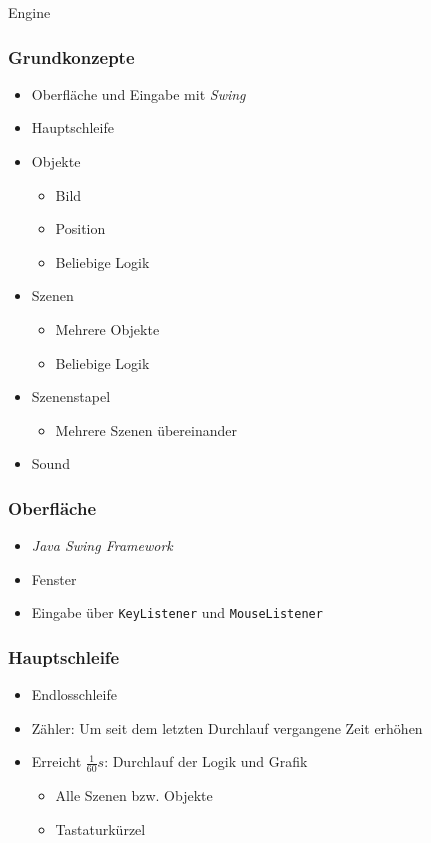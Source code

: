 \begin{frame}
	\begin{center}
		\Huge Engine
	\end{center}
\end{frame}


\begin{frame}
	\frametitle{Grundkonzepte}
	\begin{itemize}
		\item Oberfläche und Eingabe mit \textit{Swing}
		\item Hauptschleife
		\item Objekte
		\begin{itemize}
			\item Bild
			\item Position
			\item Beliebige Logik
		\end{itemize}
		\item Szenen
		\begin{itemize}
			\item Mehrere Objekte
			\item Beliebige Logik
		\end{itemize}
		\item Szenenstapel
		\begin{itemize}
			\item Mehrere Szenen übereinander
		\end{itemize}
		\item Sound
	\end{itemize}
\end{frame}

\begin{frame}
	\frametitle{Oberfläche}
	\begin{itemize}
		\item \textit{Java Swing Framework}
		\item Fenster
		\item Eingabe über \texttt{KeyListener} und \texttt{MouseListener}
	\end{itemize}
\end{frame}

\begin{frame}
	\frametitle{Hauptschleife}
	\begin{itemize}
		\item Endlosschleife
		\item Zähler: Um seit dem letzten Durchlauf vergangene Zeit erhöhen
		\item Erreicht $\frac{1}{60}s$: Durchlauf der Logik und Grafik
		\begin{itemize}
			\item Alle Szenen bzw. Objekte
			\item Tastaturkürzel
		\end{itemize}
	\end{itemize}
\end{frame}

